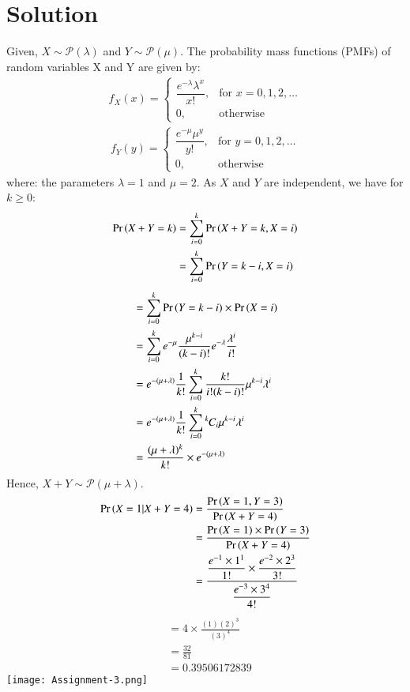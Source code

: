 \documentclass[journal,12pt,twocolumn]{IEEEtran}
\begin{document}
\section*{Solution}
Given, $X\sim \mathcal P(\lambda)$ and $Y \sim \mathcal P(\mu)$.
The probability mass functions (PMFs) of random variables X and Y are given by:
\begin{align}
  f_X(x) = 
  \begin{cases}
      \dfrac{e^{-\lambda}\lambda^{x}}{x!}, & \text{for } x=0,1,2,\dots\\
    0, & \text{otherwise } 
  \end{cases}
\end{align}
\begin{align}
  f_Y(y) = 
  \begin{cases}
     \dfrac{e^{-\mu}\mu^{y}}{y!}, & \text{for } y=0,1,2,\dots\\
    0, & \text{otherwise } 
  \end{cases}
\end{align}
where: the parameters $\lambda = 1$ and $\mu = 2$.
As $X$ and $Y$ are independent, we have for $k \geq 0$:
\begin{align}
\Pr\left(X+ Y =k\right) &= \sum_{i = 0}^k \Pr\left(X+ Y = k, X = i\right)\\
    &= \sum_{i=0}^k \Pr\left(Y = k-i , X =i\right)
\end{align}
\begin{align}
    &= \sum_{i=0}^k \Pr\left(Y = k-i\right)\times \Pr\left(X=i\right)\\
    &= \sum_{i=0}^k e^{-\mu}\frac{\mu^{k-i}}{(k-i)!}e^{-\lambda}\frac{\lambda^i}{i!}\\
   &= e^{-(\mu + \lambda)}\frac 1{k!}\sum_{i=0}^k \frac{k!}{i!(k-i)!}\mu^{k-i}\lambda^i\\
   &= e^{-(\mu + \lambda)}\frac 1{k!}\sum_{i=0}^k {{}^{k}\mkern-1muC_{i}} \mu^{k-i}\lambda^i\\
   &= \frac{(\mu + \lambda)^k}{k!} \times e^{-(\mu + \lambda)}
\end{align}
Hence,  $X+ Y \sim \mathcal P(\mu + \lambda)$.
\begin{align}
\Pr\left(X=1|X+Y=4\right) &= \frac{\Pr\left(X=1, Y=3\right)}{\Pr\left(X+Y=4\right)}\\
&= \frac{\Pr\left(X=1\right) \times \Pr\left(Y=3\right)}{\Pr\left(X+Y=4\right)} \\
&= \frac{\dfrac{e^{-1}\times1^{1}}{1!} \times \dfrac{e^{-2}\times2^{3}}{3!}}{\dfrac{e^{-3}\times3^{4}}{4!}}
\end{align}
\begin{align}
&= 4 \times \frac{(1)(2)^{3}}{(3)^{4}}\\
&= \frac{32}{81}\\
&= 0.39506172839
\end{align}
\bigskip
{}
\texttt{[image: Assignment-3.png]}
\end{document}
